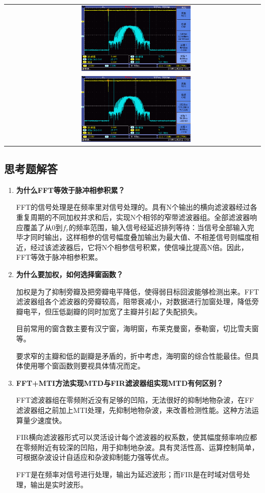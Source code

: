 \documentclass[12pt]{article}
\begin{document}
\begin{longtable}{|c|c|}
      &\includegraphics[width=0.45\textwidth]{data/new2/F0014TEK}\\
      &\includegraphics[width=0.45\textwidth]{data/new2/F0015TEK}\\
      \hline
\end{longtable}
\subsection{思考题解答}
\begin{enumerate}
  \item \textbf{为什么FFT等效于脉冲相参积累？}\par
  FFT的信号处理是在频率里对信号处理的。具有N个输出的横向滤波器经过各重复周期的不同加权并求和后，实现N个相邻的窄带滤波器组。全部滤波器响应覆盖了从0到$f_r$的频率范围，输入信号经延迟排列等待：当信号全部输入完毕才同时输出，这样相参的信号幅度叠加输出为最大值、不相差信号则幅度相近，经过该滤波器后，它将N个相参信号积累，使信噪比提高N倍。因此，FFT等效于脉冲相参积累。
  \item \textbf{为什么要加权，如何选择窗函数？}\par
  加权是为了抑制旁瓣及把旁瓣电平降低，使得弱目标回波能够检测出来。FFT滤波器组各个滤波器的旁瓣较高，阻带衰减小，对数据进行加窗处理，降低旁瓣电平，但压低副瓣的同时加宽了主瓣并引起了失配损失。\par 目前常用的窗含数主要有汉宁窗，海明窗，布莱克曼窗，泰勒窗，切比雪夫窗等。\par 要求窄的主瓣和低的副瓣是矛盾的，折中考虑，海明窗的综合性能最佳。但具体使用哪个窗函数则要视具体情况而定。
  \item \textbf{FFT+MTI方法实现MTD与FIR滤波器组实现MTD有何区别？}\par
  FFT滤波器组在零频附近没有足够的凹陷，无法很好的抑制地物杂波，在FF滤波器组之前加上MTI处理，先抑制地物杂波，来改善检测性能。这种方法运算量少速度快。\par
  FIR横向滤波器形式可以灵活设计每个滤波器的权系数，使其幅度频率响应都在零频附近有较深的凹陷，用于抑制地杂波。具有灵活性高、运算控制简单，可根据杂波设计自适应和杂波抑制能力强等优点。\par
  FFT是在频率对信号进行处理，输出为延迟波形；而FIR是在时域对信号处理，输出是实时波形。
\end{enumerate}
\appendix
\end{document}
